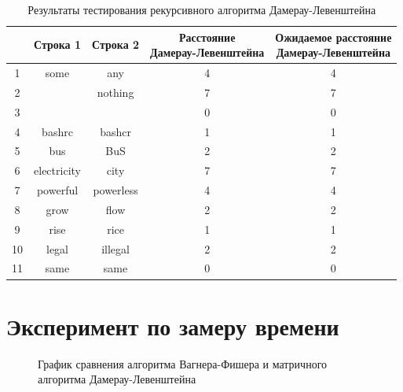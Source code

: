 \begin{table}[H]
    \caption{Результаты тестирования рекурсивного алгоритма Дамерау-Левенштейна}
	\begin{tabular}{|c|c|c|c|c|}
 	\hline
    \No{} & Строка 1 & Строка 2 & \makecell{Расстояние\\Дамерау-Левенштейна} & \makecell{Ожидаемое расстояние\\Дамерау-Левенштейна} \\
 	\hline
 	1 & some & any & 4 & 4\\
 	\hline
 	2 & & nothing & 7 & 7\\
 	\hline
 	3 & & & 0 & 0\\
 	\hline
 	4 & bashrc & bashcr & 1 & 1\\
 	\hline
 	5 & bus & BuS & 2 & 2\\
 	\hline
 	6 & electricity & city & 7 & 7\\
 	\hline
 	7 & powerful & powerless & 4 & 4\\
 	\hline
 	8 & grow & flow & 2 & 2\\
 	\hline
 	9 & rise & rice & 1 & 1\\
 	\hline
    10 & legal & illegal & 2 & 2\\
 	\hline
    11 & same & same & 0 & 0\\
    \hline
	\end{tabular}
\end{table}

\section{Эксперимент по замеру времени}

\begin{figure}[H]
    \centering
    \caption{График сравнения алгоритма Вагнера-Фишера и матричного алгоритма Дамерау-Левенштейна}
\end{figure}

